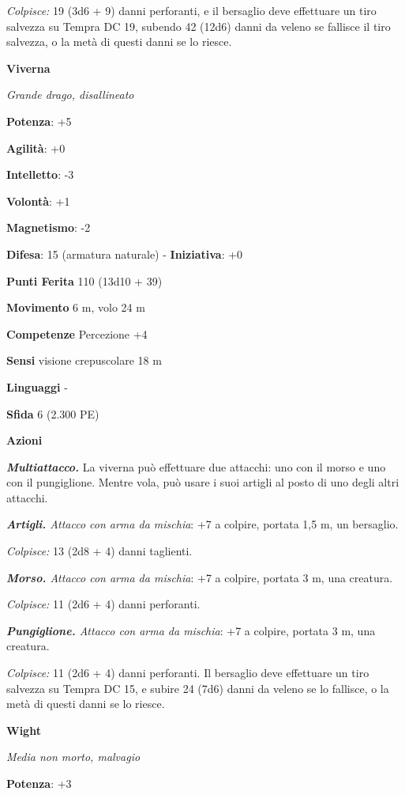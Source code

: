 \begin{multicols}{2}
\emph{Colpisce:} 19 (3d6 + 9) danni perforanti, e il bersaglio deve
effettuare un tiro salvezza su Tempra DC 19, subendo 42 (12d6)
danni da veleno se fallisce il tiro salvezza, o la metà di questi danni
se lo riesce.

\textbf{Viverna}

\emph{Grande drago, disallineato}

\textbf{Potenza}: +5

\textbf{Agilità}: +0

\textbf{Intelletto}: -3

\textbf{Volontà}: +1

\textbf{Magnetismo}: -2

\textbf{Difesa}: 15 (armatura naturale) - \textbf{Iniziativa}: +0

\textbf{Punti Ferita} 110 (13d10 + 39)

\textbf{Movimento} 6 m, volo 24 m

\textbf{Competenze} Percezione +4

\textbf{Sensi} visione crepuscolare 18 m

\textbf{Linguaggi} -

\textbf{Sfida} 6 (2.300 PE)

\textbf{Azioni}

\emph{\textbf{Multiattacco.}} La viverna può effettuare due attacchi:
uno con il morso e uno con il pungiglione. Mentre vola, può usare i suoi
artigli al posto di uno degli altri attacchi.

\emph{\textbf{Artigli.} Attacco con arma da mischia}: +7 a colpire,
portata 1,5 m, un bersaglio.

\emph{Colpisce:} 13 (2d8 + 4) danni taglienti.

\emph{\textbf{Morso.} Attacco con arma da mischia}: +7 a colpire,
portata 3 m, una creatura.

\emph{Colpisce:} 11 (2d6 + 4) danni perforanti.

\emph{\textbf{Pungiglione.} Attacco con arma da mischia}: +7 a colpire,
portata 3 m, una creatura.

\emph{Colpisce:} 11 (2d6 + 4) danni perforanti. Il bersaglio deve
effettuare un tiro salvezza su Tempra DC 15, e subire 24 (7d6)
danni da veleno se lo fallisce, o la metà di questi danni se lo riesce.



\textbf{Wight}

\emph{Media non morto, malvagio}

\textbf{Potenza}: +3


\end{multicols}
